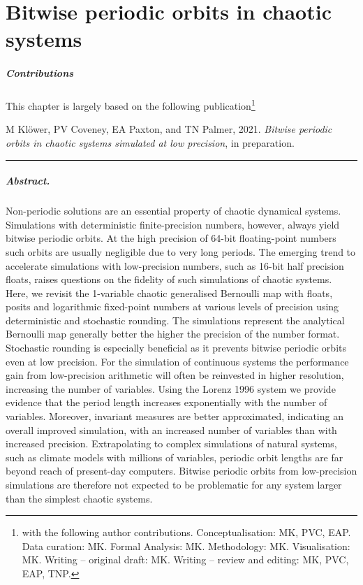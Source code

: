 \chapter{Bitwise periodic orbits in chaotic systems}
\label{chap:orbits}

\small \paragraph{Contributions} This chapter is largely based on the following publication\footnote{with the following author contributions.
Conceptualisation: MK, PVC, EAP. Data curation: MK. Formal Analysis: MK. Methodology: MK. Visualisation: MK. Writing – original draft:
MK. Writing – review and editing: MK, PVC, EAP, TNP.}

\vspace{\baselineskip}
\indent M Klöwer, PV Coveney, EA Paxton, and TN Palmer, 2021.
\emph{Bitwise periodic orbits in chaotic systems simulated at low precision}, in preparation.
\vspace{\baselineskip}
\hrule
\vspace{\baselineskip}
\normalsize

\paragraph{Abstract.} Non-periodic solutions are an essential property of chaotic dynamical systems. Simulations with
deterministic finite-precision numbers, however, always yield bitwise periodic orbits. At the high precision of 64-bit
floating-point numbers such orbits are usually negligible due to very long periods. The emerging trend to accelerate
simulations with low-precision numbers, such as 16-bit half precision floats, raises questions on the fidelity of such
simulations of chaotic systems. Here, we revisit the 1-variable chaotic generalised Bernoulli map with floats, posits
and logarithmic fixed-point numbers at various levels of precision using deterministic and stochastic rounding. The
simulations represent the analytical Bernoulli map generally better the higher the precision of the number format.
Stochastic rounding is especially beneficial as it prevents bitwise periodic orbits even at low precision. For the simulation
of continuous systems the performance gain from low-precision arithmetic will often be reinvested in higher resolution,
increasing the number of variables. Using the Lorenz 1996 system we provide evidence that the period length increases
exponentially with the number of variables. Moreover, invariant measures are better approximated, indicating an overall
improved simulation, with an increased number of variables than with increased precision. Extrapolating to complex
simulations of natural systems, such as climate models with millions of variables, periodic orbit lengths are far beyond
reach of present-day computers. Bitwise periodic orbits from low-precision simulations are therefore not expected to
be problematic for any system larger than the simplest chaotic systems.

